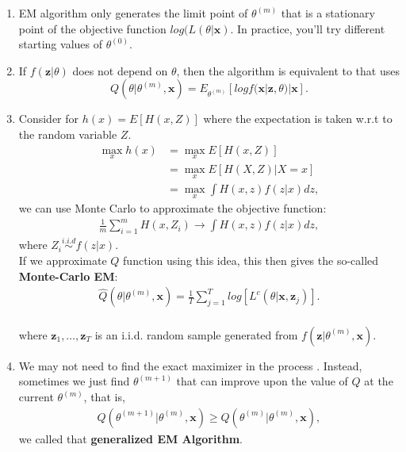 \documentclass[
  14pt,
]{article}
\providecommand{\tightlist}{%
  \setlength{\itemsep}{0pt}\setlength{\parskip}{0pt}}
\begin{document}
\begin{enumerate}
\def\labelenumi{(\arabic{enumi})}
\tightlist
\item
  EM algorithm only generates the limit point of \(\theta^{(m)}\) that
  is a stationary point of the objective function
  \(log(L(\theta|\boldsymbol{x})\). In practice, you'll try different
  starting values of \(\theta^{(0)}\).\\
\item
  If \(f(\boldsymbol{z}|\theta)\) does not depend on \(\theta\), then
  the algorithm is equivalent to that uses \[
  Q(\theta |\theta^{(m)},\boldsymbol{x})= E_{\theta^{(m)}}[logf(\boldsymbol{x}|\boldsymbol{z}, \theta)|\boldsymbol{x}].
  \]
\item
  Consider for \(h(x)=E[H(x,Z)]\) where the expectation is taken w.r.t
  to the random variable \(Z\). \begin{align*}
    \max\limits_{x} h(x) &= \max \limits_{x} E[H(x,Z)] \\
                     &= \max \limits_{x} E[H(X,Z)|X = x] \\ 
                     &= \max \limits_{x} \int H(x,z)f(z|x)dz, 
  \end{align*} we can use Monte Carlo to approximate the objective
  function: \begin{align*}
    \frac{1}{m}\sum^{m}_{i=1}H(x,Z_{i}) \to \int H(x,z)f(z|x)dz,
  \end{align*} where \(Z_{i} \stackrel{i.i.d}{\sim} f(z|x)\).\\
  If we approximate \(Q\) function using this idea, this then gives the
  so-called \textbf{Monte-Carlo EM}: \begin{align*}
    \hat{Q}(\theta|\theta^{(m)},\boldsymbol{x}) = \frac{1}{T}\sum^{T}_{j=1}log[L^{c}(\theta|\boldsymbol{x},\boldsymbol{z}_j)]. 
  \end{align*}\\
  where \(\boldsymbol{z}_1, \ldots, \boldsymbol{z}_T\) is an i.i.d.
  random sample generated from
  \(f(\boldsymbol{z}|\theta^{(m)}, \boldsymbol{x})\).
\item
  We may not need to find the exact maximizer in the process . Instead,
  sometimes we just find \(\theta^{(m+1)}\) that can improve upon the
  value of \(Q\) at the current \(\theta^{(m)}\), that is,
  \begin{align*}
    Q(\theta^{(m+1)}|\theta^{(m)},\boldsymbol{x}) \ge Q(\theta^{(m)}|\theta^{(m)},\boldsymbol{x}),  
  \end{align*} we called that \textbf{generalized EM Algorithm}.
\end{enumerate}
\end{document}
